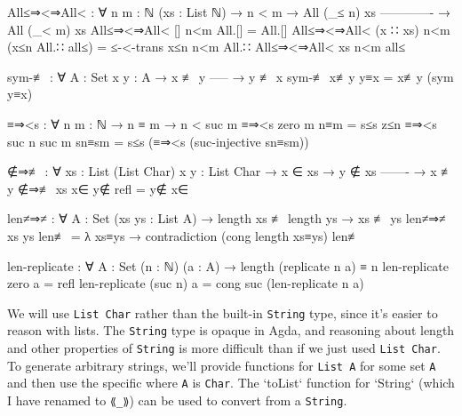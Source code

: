 \begin{comment}
  -- Import list membership using List Char comparisons.
  private
    _≟lchar_ : ∀ (xs ys : List Char) → Dec (xs ≡ ys)
    xs ≟lchar ys = ≡-dec (_≟char_) xs ys
  
  open DecPropMembership _≟lchar_ using (_∈_; _∉_; _∈?_)

  \end{code}
  
  Include some infixes.
  
  \begin{code}
  infix  4  _∋_⦂_
  infix  4 _⊢_⦂_
  infixl 5 _,_⦂_
  
  infixr 7 _⇒_
  
  infix  5 ƛ_
  infixl 7 _·_
  infix  9 free_
  infix  9 bound_
  
  infix 4 _—→_
  \end{code}
\end{comment}
\begin{code}
  All≤⇒<⇒All< : ∀ {n m : ℕ} (xs : List ℕ)
    → n < m
    → All (_≤ n) xs
      -------------
    → All (_< m) xs
  All≤⇒<⇒All< [] n<m All.[] = All.[]
  All≤⇒<⇒All< (x ∷ xs) n<m (x≤n All.∷ all≤) =
    ≤-<-trans x≤n n<m All.∷ All≤⇒<⇒All< xs n<m all≤

  sym-≢ : ∀ {A : Set} {x y : A}
    → x ≢ y
      -----
    → y ≢ x
  sym-≢ x≢y y≡x = x≢y (sym y≡x)

  ≡⇒<s : ∀ {n m : ℕ} → n ≡ m → n < suc m
  ≡⇒<s {zero} {m} n≡m = s≤s z≤n
  ≡⇒<s {suc n} {suc m} sn≡sm = s≤s (≡⇒<s (suc-injective sn≡sm))

  ∉⇒≢ : ∀ {xs : List (List Char)} {x y : List Char}
    → x ∈ xs
    → y ∉ xs
      -------
    → x ≢ y
  ∉⇒≢ {xs} x∈ y∉ refl = y∉ x∈

  len≠⇒≠ : ∀ {A : Set} (xs ys : List A)
    → length xs ≢ length ys → xs ≢ ys
  len≠⇒≠ xs ys len≢ =
    λ xs≡ys → contradiction (cong length xs≡ys) len≢

  len-replicate : ∀ {A : Set} (n : ℕ) (a : A)
    → length (replicate n a) ≡ n
  len-replicate zero a = refl
  len-replicate (suc n) a = cong suc (len-replicate n a)
\end{code}


We will use \texttt{List Char} rather than the built-in \texttt{String} type, since it's easier to
reason with lists. The \texttt{String} type is opaque in Agda, and reasoning about length and other
properties of \texttt{String} is more difficult than if we just used \texttt{List Char}. To generate
arbitrary strings, we'll provide functions for \texttt{List A} for some set \texttt{A} and then use
the specific where \texttt{A} is \texttt{Char}. The `toList` function for `String` (which I have
renamed to \texttt{⟪\_⟫}) can be used to convert from a \texttt{String}.

